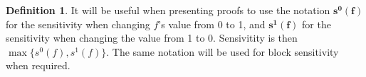 \documentclass[psamsfonts]{amsart}
\theoremstyle{definition}
\newtheorem{defn}[thm]{Definition}
\theoremstyle{remark}
\numberwithin{equation}{section}
\begin{document}
\begin{defn}\label{oneandzero}
It will be useful when presenting proofs to use the notation $\boldsymbol{s^{0}(f)}$ for the sensitivity when changing $f$'s value from 0 to 1, 
and $\boldsymbol{s^{1}(f)}$ for the sensitivity when changing 
the value from 1 to 0.  Sensivitity is then $\max \{ s^{0}(f), s^{1}(f)\}$.  The same notation will be used for block sensitivity when required.  
\end{defn}
\end{document}
